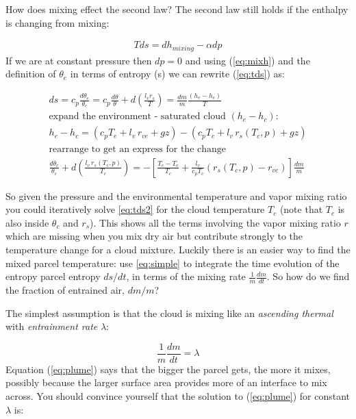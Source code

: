 \documentclass[12pt]{article}
\begin{document}
How does mixing effect the second law?  The second
law still holds if the enthalpy is changing from mixing:


\begin{gather}
  T ds  =  dh_{mixing} - \alpha dp
\label{eq:tds}
\end{gather}
If we are at constant pressure then $dp=0$ and using
(\ref{eq:mixh}) and the definition of $\theta_e$ in terms of entropy (s)
we can rewrite (\ref{eq:tds}) as:

\begin{gather}
   ds = c_p \frac{d \theta_e }{\theta_e} = c_p \frac{ d\theta}{\theta}
   + d \left ( \frac{l_v r_s}{T} \right ) =  \frac{ dm}{m} \frac{ (h_e - h_c)}{T}\label{eq:simple}\\
\text{expand the environment - saturated cloud $(h_e - h_c)$: }\nonumber \\
h_e - h_c =  (c_p T_e + l_v\, r_{ve} + g z) - (c_p T_c + l_v\, r_s(T_c,p) + g z)\\
\text{rearrange to get  an express for the change }\\
  \frac{d\theta_c}{\theta_c} + d \left ( \frac{l_v\,r_s(T_c,p)}{T_c} \right ) = 
  - \left [ \frac{T_c - T_e}{T_c} + \frac{l_v}{c_p T_c} (r_s(T_c,p) - r_{ve}) \right ]
   \frac{dm}{m}
\label{eq:tds2}
\end{gather}

So given the pressure and the environmental temperature and vapor mixing ratio you could
iteratively solve \eqref{eq:tds2} for the cloud temperature $T_c$ (note that $T_c$ is also
inside $\theta_c$ and $r_s$).   This shows all the terms involving the vapor mixing ratio $r$ which
are missing when you mix dry air but contribute strongly to the temperature change for 
a cloud mixture.  Luckily there is an easier way to find the mixed parcel temperature: use \eqref{eq:simple}  to 
integrate the time evolution of the entropy parcel entropy $ds/dt$, in terms of the mixing rate $\frac{1}{m}\frac{dm}{dt}$. 
So how do we find the fraction of entrained air, $dm/m$?

The simplest assumption is  that the cloud is mixing
like an \textit{ascending thermal} with \textit{entrainment rate}
$\lambda$:

\begin{equation}
  \label{eq:plume}
  \frac{1}{m} \frac{dm}{dt} = \lambda
\end{equation}
Equation (\ref{eq:plume}) says that the bigger the parcel gets, the
more it mixes, possibly because the larger surface area provides more
of an interface to mix across.  You should convince yourself that
the solution to (\ref{eq:plume}) for constant $\lambda$ is:
\end{document}
